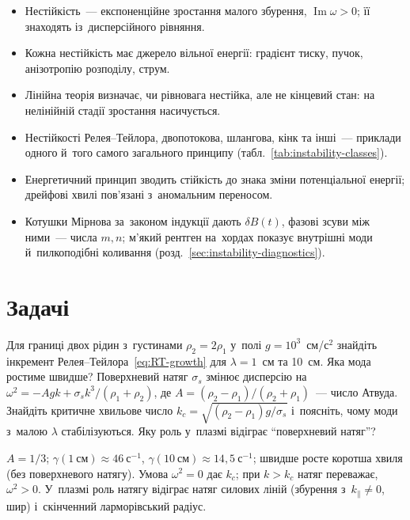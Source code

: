 \begin{Summary}
\begin{itemize}
\item Нестійкість~--- експоненційне зростання малого збурення, $\operatorname{Im}\omega>0$; її знаходять із~дисперсійного рівняння.
\item Кожна нестійкість має джерело вільної енергії: градієнт тиску, пучок, анізотропію розподілу, струм.
\item Лінійна теорія визначає, чи рівновага нестійка, але не кінцевий стан: на нелінійній стадії зростання насичується.
\item Нестійкості Релея--Тейлора, двопотокова, шлангова, кінк та інші~--- приклади одного й~того самого загального принципу (табл.~\ref{tab:instability-classes}).
\item Енергетичний принцип зводить стійкість до знака зміни потенціальної енергії; дрейфові хвилі пов'язані з~аномальним переносом.
\item Котушки Мірнова за~законом індукції дають $\delta B(t)$, фазові зсуви між ними~--- числа $m,n$; м'який рентген на~хордах показує внутрішні моди й~пилкоподібні коливання (розд.~\ref{sec:instability-diagnostics}).
\end{itemize}
\end{Summary}

\section*{Задачі}

\begin{problem}\label{prb:RTGrowth}
Для границі двох рідин з~густинами $\rho_2=2\rho_1$ у~полі $g=10^3$~см/с$^2$ знайдіть інкремент
Релея--Тейлора~\eqref{eq:RT-growth} для $\lambda=1$~см та 10~см. Яка мода ростиме швидше? Поверхневий натяг $\sigma_s$ змінює дисперсію на
$\omega^2=-Agk+\sigma_sk^3/(\rho_1+\rho_2)$, де $A=(\rho_2-\rho_1)/(\rho_2+\rho_1)$~--- число Атвуда.
Знайдіть критичне хвильове число $k_c=\sqrt{(\rho_2-\rho_1)g/\sigma_s}$ і~поясніть, чому моди з~малою
$\lambda$ стабілізуються. Яку роль у~плазмі відіграє \enquote{поверхневий натяг}?
	\begin{solution}
		$A=1/3$; $\gamma(1~\text{см})\approx46~\mathrm{с}^{-1}$, $\gamma(10~\text{см})\approx14{,}5~\mathrm{с}^{-1}$; швидше росте коротша хвиля (без поверхневого натягу). Умова $\omega^2=0$ дає $k_c$; при $k>k_c$ натяг переважає, $\omega^2>0$. У~плазмі роль натягу відіграє натяг силових ліній (збурення з~$k_\parallel\ne0$, шир) і~скінченний ларморівський радіус.
	\end{solution}
\end{problem}

